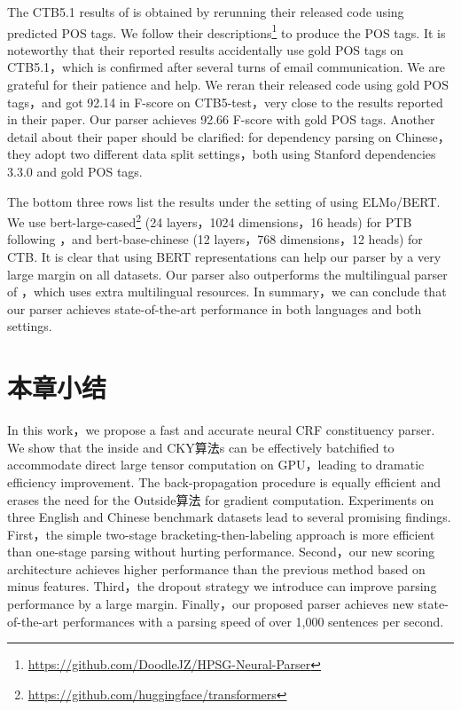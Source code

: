 The CTB5.1 results of \cite{zhou-zhao-2019-head} is obtained by rerunning their released code using predicted POS tags.
We follow their descriptions\footnote{\url{https://github.com/DoodleJZ/HPSG-Neural-Parser}} to produce the POS tags.
It is noteworthy that their reported results accidentally use gold POS tags on CTB5.1，which is confirmed after several turns of email communication. We are grateful for their patience and help.
We reran their released code using gold POS tags，and got 92.14 in F-score on CTB5-test，very close to the results reported in their paper.
Our parser achieves 92.66 F-score with gold POS tags.
Another detail about their paper should be clarified: for dependency parsing on Chinese，they adopt two different data split settings，both using Stanford dependencies 3.3.0 and gold POS tags.

The bottom three rows list the results under the setting of using ELMo/BERT.
We use bert-large-cased\footnote{\url{https://github.com/huggingface/transformers}} (24 layers，1024 dimensions，16 heads) for PTB following \cite{kitaev-etal-2019-multilingual}，and bert-base-chinese (12 layers，768 dimensions，12 heads) for CTB.
It is clear that using BERT representations can help our parser by a very large margin on all datasets. %
Our parser also outperforms the multilingual parser of \cite{kitaev-etal-2019-multilingual}，which uses extra multilingual resources.
In summary，we can conclude that our parser achieves state-of-the-art performance in both languages and both settings.

\section{本章小结}\label{sec:con-conclusions}

In this work，we propose a fast and accurate neural CRF constituency parser. We show that the inside and CKY算法s can be effectively batchified to accommodate direct large tensor computation on GPU，leading to dramatic efficiency improvement.
The back-propagation procedure is equally efficient and erases the need for the Outside算法 for gradient computation.
Experiments on three English and Chinese benchmark datasets lead to several promising findings.
First，the simple two-stage bracketing-then-labeling approach is more efficient than one-stage parsing without hurting performance.
Second，our new scoring architecture achieves higher performance than the previous method based on minus features.
Third，the dropout strategy we introduce can improve parsing performance by a large margin.
Finally，our proposed parser achieves new state-of-the-art performances with a parsing speed of over 1,000 sentences per second.
